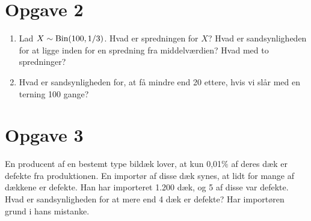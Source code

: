 \section*{Opgave 2}
\begin{enumerate}[label=\roman*)]
\item Lad $X\sim \textnormal{Bin}(100,1/3)$. Hvad er spredningen for $X$? Hvad er sandsynligheden for at ligge inden for en spredning fra middelværdien? Hvad med to spredninger? 
\item Hvad er sandsynligheden for, at få mindre end 20 ettere, hvis vi slår med en terning 100 gange?
\end{enumerate}
\section*{Opgave 3}
En producent af en bestemt type bildæk lover, at kun 0,01$\%$ af deres dæk er defekte fra produktionen. En importør af disse dæk synes, at lidt for mange af dækkene er defekte. Han har importeret 1.200 dæk, og 5 af disse var defekte. Hvad er sandsynligheden for at mere end 4 dæk er defekte? Har importøren grund i hans mistanke.
